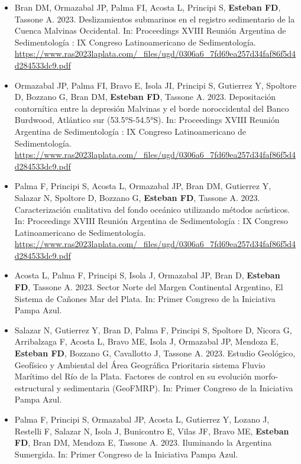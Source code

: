 \documentclass[11pt, a4paper]{article}
\begin{document}
\begin{itemize}
  \item Bran DM, Ormazabal JP, Palma FI, Acosta L, Principi S, \textbf{Esteban FD}, Tassone A. 2023. Deslizamientos submarinos en el registro sedimentario de la Cuenca Malvinas Occidental. In: Proceedings XVIII Reunión Argentina de Sedimentología : IX Congreso Latinoamericano de Sedimentología. \url{https://www.ras2023laplata.com/_files/ugd/0306a6_7fd69ea257d34faf86f5d4d284533dc9.pdf}

  \item Ormazabal JP, Palma FI, Bravo E, Isola JI, Principi S, Gutierrez Y, Spoltore D, Bozzano G, Bran DM, \textbf{Esteban FD}, Tassone A. 2023. Depositación contornítica entre la depresión Malvinas y el borde noroccidental del Banco Burdwood, Atlántico sur (53.5°S-54.5°S). In: Proceedings XVIII Reunión Argentina de Sedimentología : IX Congreso Latinoamericano de Sedimentología. \url{https://www.ras2023laplata.com/_files/ugd/0306a6_7fd69ea257d34faf86f5d4d284533dc9.pdf}

  \item Palma F, Principi S, Acosta L, Ormazabal JP, Bran DM, Gutierrez Y, Salazar N, Spoltore D, Bozzano G, \textbf{Esteban FD}, Tassone A. 2023. Caracterización cualitativa del fondo oceánico utilizando métodos acústicos. In: Proceedings XVIII Reunión Argentina de Sedimentología : IX Congreso Latinoamericano de Sedimentología. \url{https://www.ras2023laplata.com/_files/ugd/0306a6_7fd69ea257d34faf86f5d4d284533dc9.pdf}

  \item Acosta L, Palma F, Principi S, Isola J, Ormazabal JP, Bran D, \textbf{Esteban FD}, Tassone A. 2023. Sector Norte del Margen Continental Argentino, El Sistema de Cañones Mar del Plata. In: Primer Congreso de la Iniciativa Pampa Azul.

  \item Salazar N, Gutierrez Y, Bran D, Palma F, Principi S, Spoltore D, Nicora G, Arribalzaga F, Acosta L, Bravo ME, Isola J, Ormazabal JP, Mendoza E, \textbf{Esteban FD}, Bozzano G, Cavallotto J, Tassone A. 2023. Estudio Geológico, Geofísico y Ambiental del Área Geográfica Prioritaria sistema Fluvio Marítimo del Río de la Plata. Factores de control en su evolución morfo-estructural y sedimentaria (GeoFMRP). In: Primer Congreso de la Iniciativa Pampa Azul.

  \item Palma F, Principi S, Ormazabal JP, Acosta L, Gutierrez Y, Lozano J, Restelli F, Salazar N, Isola J, Bunicontro E, Vilas JF, Bravo ME, \textbf{Esteban FD}, Bran DM, Mendoza E, Tassone A. 2023. Iluminando la Argentina Sumergida. In: Primer Congreso de la Iniciativa Pampa Azul.


\end{itemize}
\end{document}
